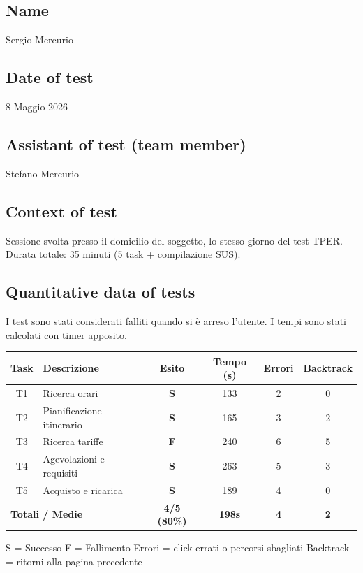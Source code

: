 ﻿\documentclass[11pt,a4paper]{article}
\begin{document}
\subsection*{Name}
\begin{tcolorbox}[base]
Sergio Mercurio
\end{tcolorbox}

\subsection*{Date of test}
\begin{tcolorbox}[base]
8 Maggio 2026
\end{tcolorbox}

\subsection*{Assistant of test (team member)}
\begin{tcolorbox}[base]
Stefano Mercurio
\end{tcolorbox}

\subsection*{Context of test}
\begin{tcolorbox}[base]
Sessione svolta presso il domicilio del soggetto, lo stesso giorno del
test TPER. Durata totale: 35 minuti (5 task +
compilazione SUS).
\end{tcolorbox}

\subsection*{Quantitative data of tests}
\begin{tcolorbox}[base]
I test sono stati considerati falliti quando si è arreso l'utente.
I tempi sono stati calcolati con timer apposito.
\begin{center}
\renewcommand{\arraystretch}{1.4}
\begin{tabular}{clcccc}
\toprule
\textbf{Task} & \textbf{Descrizione} &
\textbf{Esito} & \textbf{Tempo (s)} &
\textbf{Errori} & \textbf{Backtrack} \\
\midrule
T1 & Ricerca orari             & \textbf{S} & 133 & 2 & 0 \\
T2 & Pianificazione itinerario & \textbf{S} & 165 & 3 & 2 \\
T3 & Ricerca tariffe           & \textbf{F} & 240 & 6 & 5 \\
T4 & Agevolazioni e requisiti  & \textbf{S} & 263 & 5 & 3 \\
T5 & Acquisto e ricarica       & \textbf{S} & 189 & 4 & 0 \\
\midrule
\multicolumn{2}{l}{\textbf{Totali / Medie}} &
\textbf{4/5 (80\%)} & \textbf{198s} &
\textbf{4} & \textbf{2} \\
\bottomrule
\end{tabular}
\end{center}
\vspace{0.3cm}
\small S = Successo \quad F = Fallimento \quad
Errori = click errati o percorsi sbagliati \quad
Backtrack = ritorni alla pagina precedente
\end{tcolorbox}
\end{document}
